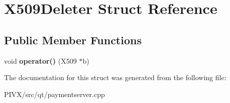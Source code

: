 \hypertarget{struct_x509_deleter}{}\section{X509\+Deleter Struct Reference}
\label{struct_x509_deleter}
\subsection*{Public Member Functions}
\begin{DoxyCompactItemize}
\item 
\mbox{\label{struct_x509_deleter_a496b2630ceb946011713fb36cc2eb0d2}} 
void {\bfseries operator()} (X509 $\ast$b)
\end{DoxyCompactItemize}


The documentation for this struct was generated from the following file\+:\begin{DoxyCompactItemize}
\item 
P\+I\+V\+X/src/qt/paymentserver.\+cpp\end{DoxyCompactItemize}
